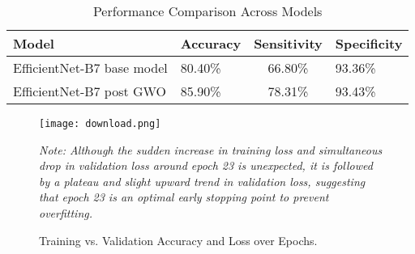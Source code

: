\documentclass[conference]{IEEEtran}
\begin{document}
\begin{table}[htbp]
\caption{Performance Comparison Across Models}
\begin{center}
\begin{tabular}{|l|l|c|l|}
\hline
\textbf{Model} &\textbf{Accuracy} & \textbf{Sensitivity} & \textbf{Specificity}\\
\hline
EfficientNet-B7 base model & 80.40\% & 66.80\% & 93.36\% \\
EfficientNet-B7 post GWO  & 85.90\% & 78.31\% & 93.43\%  \\
\hline
\end{tabular}
\label{tab1}
\end{center}
\end{table}





\begin{figure}[htbp]
\centering
\caption{Training vs. Validation Accuracy and Loss over Epochs.}
\texttt{[image: download.png]}
\label{fig:trainval}
\vspace{1mm}

\parbox{0.57\textwidth}{
\small
\textit{Note: Although the sudden increase in training loss and simultaneous drop in validation loss around epoch 23 is unexpected, it is followed by a plateau and slight upward trend in validation loss, suggesting that epoch 23 is an optimal early stopping point to prevent overfitting.}
}
\end{figure}




\FloatBarrier
\end{document}
